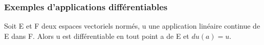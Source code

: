 \subsubsection{Exemples d'applications différentiables}
%
\begin{prop}
Soit E et F deux espaces vectoriels normés, u une
application linéaire continue de E dans F. Alors u est différentiable en
tout point a de E et $du(a) = u$.
\end{prop}
%
%
%
%
%
%
%
%
